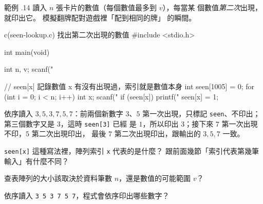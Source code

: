 範例 \thechapter.14 讀入 $n$ 張卡片的數值（每個數值最多到 $v$），每當某
個數值\emph{第二次}出現，就印出它。 模擬翻牌配對遊戲裡「配到相同的牌」
的瞬間。

\begin{center}
\label{fig:ch06-seen-array-lookup}
\end{center}

\begin{example}{c}{(seen-lookup.c) 找出第二次出現的數值}
#include <stdio.h>

int main(void) {
    int n, v;
    scanf("%

    // seen[x] 記錄數值 x 有沒有出現過，索引就是數值本身
    int seen[1005] = {0};
    for (int i = 0; i < n; i++) {
        int x;
        scanf("%
        if (seen[x]) {
            printf("%
        }
        seen[x] = 1;
    }
}
\end{example}


依序讀入 $3, 5, 3, 7, 5, 7$：前兩個新數字 $3$、$5$ 第一次出現，只標記
\texttt{seen}、不印出；第三個數字又是 $3$，這時 \texttt{seen[3]} 已經
是 $1$，所以印出 $3$；接下來 $7$ 第一次出現不印，$5$ 第二次出現印出，
最後 $7$ 第二次出現印出，跟輸出的 $3, 5, 7$ 一致。


\begin{drills}[label=drills:array-lookup]
\item \texttt{seen[x]} 這種寫法裡，陣列索引 \texttt{x} 代表的是什麼？
跟前面幾節「索引代表第幾筆輸入」有什麼不同？
\item 查表陣列的大小該取決於資料筆數 $n$，還是數值的可能範圍 $v$？
\item 依序讀入 \texttt{3 5 3 7 5 7}，程式會依序印出哪些數字？
\end{drills}

